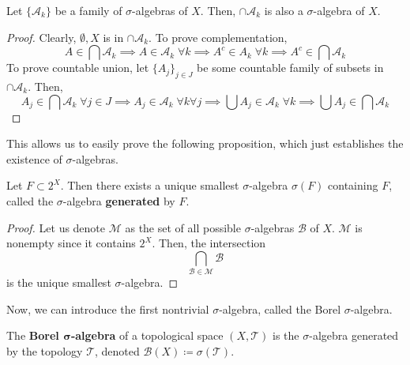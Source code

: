   \begin{theorem}
    Let $\{\mathcal{A}_k\}$ be a family of $\sigma$-algebras of $X$. Then, $\cap \mathcal{A}_k$ is also a $\sigma$-algebra of $X$. 
  \end{theorem}
  \begin{proof}
    Clearly, $\emptyset, X$ is in $\cap \mathcal{A}_k$. To prove complementation, 
    \begin{equation}
      A \in \bigcap \mathcal{A}_k \implies A \in \mathcal{A}_k \; \forall k \implies A^c \in A_k \; \forall k \implies A^c \in \bigcap \mathcal{A}_k
    \end{equation}
    To prove countable union, let $\{A_j\}_{j \in J}$ be some countable family of subsets in $\cap \mathcal{A}_k$. Then, 
    \begin{equation}
      A_j \in \bigcap \mathcal{A}_k \; \forall j \in J \implies A_j \in \mathcal{A}_k \; \forall k \forall j \implies \bigcup A_j \in \mathcal{A}_k \; \forall k \implies \bigcup A_j \in \bigcap \mathcal{A}_k
    \end{equation}
  \end{proof}

  This allows us to easily prove the following proposition, which just establishes the existence of $\sigma$-algebras. 

  \begin{proposition}
    Let $F \subset 2^X$. Then there exists a unique smallest $\sigma$-algebra $\sigma(F)$ containing $F$, called the $\sigma$-algebra \textbf{generated} by $F$. 
  \end{proposition}
  \begin{proof}
    Let us denote $\mathcal{M}$ as the set of all possible $\sigma$-algebras $\mathcal{B}$ of $X$. $\mathcal{M}$ is nonempty since it contains $2^X$. Then, the intersection 
    \begin{equation}
      \bigcap_{\mathcal{B} \in \mathcal{M}} \mathcal{B}
    \end{equation}
    is the unique smallest $\sigma$-algebra. 
  \end{proof}

  Now, we can introduce the first nontrivial $\sigma$-algebra, called the Borel $\sigma$-algebra. 

  \begin{definition}
    The \textbf{Borel $\boldsymbol{\sigma}$-algebra} of a topological space $(X, \mathscr{T})$ is the $\sigma$-algebra generated by the topology $\mathscr{T}$, denoted $\mathcal{B}(X) \coloneqq \sigma(\mathscr{T})$. 
  \end{definition} 

